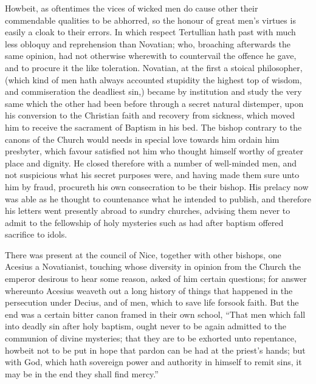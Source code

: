 Howbeit, as oftentimes the vices of wicked men do cause other their commendable qualities to be abhorred, so the honour of great men’s virtues is easily a cloak to their errors. In which respect Tertullian hath past with much less obloquy and reprehension than Novatian; who, broaching afterwards the same opinion, had not otherwise wherewith to countervail the offence he gave, and to procure it the like toleration. Novatian, at the first a stoical philosopher, (which kind of men hath always accounted stupidity the highest top of wisdom, and commiseration the deadliest sin,) became by institution and study the very same which the other had been before through a secret natural distemper, upon his conversion to the Christian faith and recovery from sickness, which moved him to receive the sacrament of Baptism in his bed. The bishop contrary to the canons of the Church would needs in special love towards him ordain him presbyter, which favour satisfied not him who thought himself worthy of greater place and dignity. He closed therefore with a number of well-minded men, and not suspicious what his secret purposes were, and having made them sure unto him by fraud, procureth his own consecration to be their bishop. His prelacy now was able as he thought to countenance what he intended to publish, and therefore his letters went presently abroad to sundry churches, advising them never to admit to the fellowship of holy mysteries such as had after baptism offered sacrifice to idols.

There was present at the council of Nice, together with other bishops, one Acesius a Novatianist, touching whose diversity in opinion from the Church the emperor desirous to hear some reason, asked of him certain questions; for answer whereunto Acesius weaveth out a long history of things that  happened in the persecution under Decius, and of men, which to save life forsook faith. But the end was a certain bitter canon framed in their own school, “That men which fall into deadly sin after holy baptism, ought never to be again admitted to the communion of divine mysteries; that they are to be exhorted unto repentance, howbeit not to be put in hope that pardon can be had at the priest’s hands; but with God, which hath sovereign power and authority in himself to remit sins, it may be in the end they shall find mercy.”

